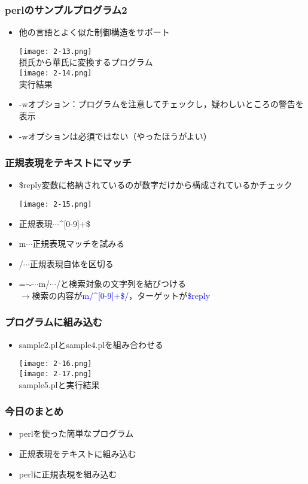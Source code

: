 \documentclass[dvipdfmx,11pt,notheorems]{beamer}
\begin{document}
\begin{frame}
\frametitle{perlのサンプルプログラム2}
\begin{itemize}
\item 他の言語とよく似た制御構造をサポート
\begin{center}
\texttt{[image: 2-13.png]}\\
摂氏から華氏に変換するプログラム\\
\vspace{\baselineskip}
\texttt{[image: 2-14.png]}\\
実行結果\\
\end{center}
\item -wオプション：プログラムを注意してチェックし，疑わしいところの警告を表示
\item -wオプションは必須ではない（やったほうがよい）
\end{itemize}
\end{frame}

\begin{frame}
\frametitle{正規表現をテキストにマッチ}
\begin{itemize}
\item \$reply変数に格納されているのが数字だけから構成されているかチェック
\begin{center}
\texttt{[image: 2-15.png]}
\end{center}
\item 正規表現$\cdots$\^{}[0-9]+\$
\item m$\cdots$正規表現マッチを試みる
\item /$\cdots$正規表現自体を区切る
\item =$\sim$$\cdots$m/$\cdots$/と検索対象の文字列を結びつける\\
$\rightarrow$検索の内容が\textcolor{blue}{m/\^{}[0-9]+\$/}，ターゲットが\textcolor{blue}{\$reply}
\end{itemize}
\end{frame}

\begin{frame}
\frametitle{プログラムに組み込む}
\begin{itemize}
\item sample2.plとsample4.plを組み合わせる
\begin{center}
\texttt{[image: 2-16.png]}\\
\texttt{[image: 2-17.png]}\\
sample5.plと実行結果\\
\end{center}
\end{itemize}
\end{frame}

\begin{frame}
\frametitle{今日のまとめ}
\begin{itemize}
\item perlを使った簡単なプログラム
\item 正規表現をテキストに組み込む
\item perlに正規表現を組み込む
\end{itemize}
\end{frame}
\end{document}
